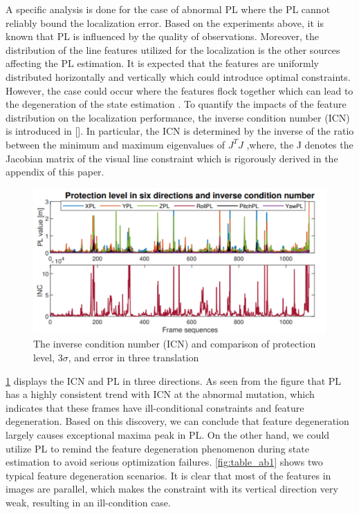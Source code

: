 \documentclass[10pt, letterpaper]{article}
\begin{document}
\begin{multicols*}{2}
A specific analysis is done for the case of abnormal PL where
the PL cannot reliably bound the localization error. Based on
the experiments above, it is known that PL is influenced by the
quality of observations. Moreover, the distribution of the line features utilized for the localization is the other sources
affecting the PL estimation. It is expected that the features are
uniformly distributed horizontally and vertically which could
introduce optimal constraints. However, the case could occur
where the features flock together which can lead to the
degeneration of the state estimation \cite{zhang2016degeneracy}. To quantify the
impacts of the feature distribution on the localization
performance, the inverse condition number (ICN) is introduced
in [\cite{zhang2016degeneracy}]. In particular, the ICN is determined by the inverse of
the ratio between the minimum and maximum eigenvalues of
$J^T J$ ,where, the J denotes the Jacobian matrix of the visual line
constraint which is rigorously derived in the appendix of this
paper.
\begin{figure}[H]
    \centering
    \includegraphics[width=\columnwidth]{images/frame_se2.png}
    \caption{The inverse condition number (ICN) and comparison of protection level, 3$\sigma$, and error in three translation }
    \label{fig:Frame_sequence2}
\end{figure}
\cref{fig:Frame_sequence2} displays the ICN and PL in three directions. As seen
from the figure that PL has a highly consistent trend with ICN
at the abnormal mutation, which indicates that these frames
have ill-conditional constraints and feature degeneration. Based
on this discovery, we can conclude that feature degeneration
largely causes exceptional maxima peak in PL. On the other
hand, we could utilize PL to remind the feature degeneration
phenomenon during state estimation to avoid serious
optimization failures. \cref{fig:table_ab1} shows two typical feature
degeneration scenarios. It is clear that most of the features in
images are parallel, which makes the constraint with its vertical
direction very weak, resulting in an ill-condition case.


\end{multicols*}
\end{document}
